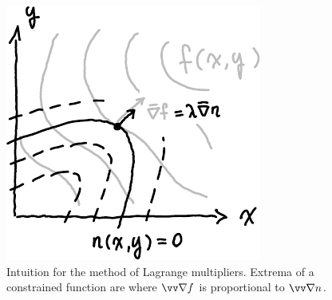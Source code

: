 \documentclass[twocolumn, margin=small]{tex/hsrzf}
\theoremstyle{fuvarzf}
\begin{document}
\begin{figure}
  \centering
  \includegraphics{img/lagrange-multipliers}
  \caption{
    Intuition for the method of Lagrange multipliers.  Extrema of a constrained
    function are where \(\grad f\) is proportional to \(\grad n\).
  }
\end{figure}
\end{document}
